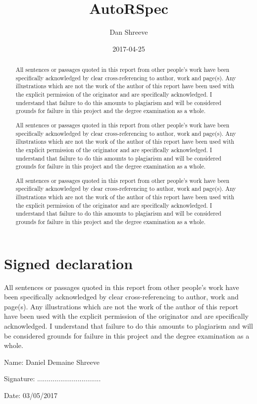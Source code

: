 \documentclass{article}
\title{AutoRSpec}
\date{2017-04-25}
\author{Dan Shreeve}
\begin{document}
\maketitle

\newpage
{}
\section*{Signed declaration}
All sentences or passages quoted in this report from other people's work have been specifically acknowledged by clear cross-referencing to author, work and page(s). Any illustrations which are not the work of the author of this report have been used with the explicit permission of the originator and are specifically acknowledged. I understand that failure to do this amounts to plagiarism and will be considered grounds for failure in this project and the degree examination as a whole.
\par Name: Daniel Demaine Shreeve
\par Signature: .................................
\par Date: 03/05/2017

\newpage
{}
\begin{abstract}
All sentences or passages quoted in this report from other people's work have been specifically acknowledged by clear cross-referencing to author, work and page(s). Any illustrations which are not the work of the author of this report have been used with the explicit permission of the originator and are specifically acknowledged. I understand that failure to do this amounts to plagiarism and will be considered grounds for failure in this project and the degree examination as a whole.
\par All sentences or passages quoted in this report from other people's work have been specifically acknowledged by clear cross-referencing to author, work and page(s). Any illustrations which are not the work of the author of this report have been used with the explicit permission of the originator and are specifically acknowledged. I understand that failure to do this amounts to plagiarism and will be considered grounds for failure in this project and the degree examination as a whole.
\par All sentences or passages quoted in this report from other people's work have been specifically acknowledged by clear cross-referencing to author, work and page(s). Any illustrations which are not the work of the author of this report have been used with the explicit permission of the originator and are specifically acknowledged. I understand that failure to do this amounts to plagiarism and will be considered grounds for failure in this project and the degree examination as a whole.
\end{abstract}
\end{document}
